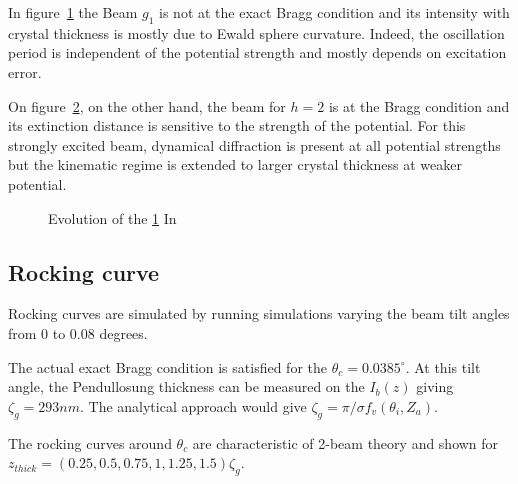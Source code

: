 \documentclass[a4paper,10pt]{article}
\begin{document}
In figure~\ref{fig:2_beam_I1} the Beam $g_1$ is not at the exact Bragg condition and its intensity with crystal thickness is mostly due to Ewald sphere curvature. Indeed, the oscillation period is independent of the potential strength and mostly depends on excitation error.

On figure~\ref{fig:2_beam_I2}, on the other hand, the beam for $h=2$ is at the Bragg condition and its extinction distance is sensitive to the strength of the potential.
For this strongly excited beam, dynamical diffraction is present at all potential strengths but the kinematic regime is extended to larger crystal thickness at weaker potential.

\begin{figure}[h!]
	\begin{subfigure}{\textwidth}
		\centering
		\begin{subfigure}{0.3\textwidth}
			\centering
      \def\svgwidth{\columnwidth}
			
			\caption{}\label{fig:2_beam_I1}
		\end{subfigure}
		\begin{subfigure}{0.3\textwidth}
			\centering
      \def\svgwidth{\columnwidth}
			
			\caption{}\label{fig:2_beam_I2}
		\end{subfigure}
		\begin{subfigure}{0.3\textwidth}
			\centering
      \def\svgwidth{\columnwidth}
			
			\caption{}\label{fig:2_beam_xi}
		\end{subfigure}
  \end{subfigure}
	\caption[2-beam extinction]{
    Evolution of the
		\ref{fig:2_beam_I1} In
	}\label{fig:2_beam_zeta}
\end{figure}


\subsection{Rocking curve}
Rocking curves are simulated by running simulations varying the beam tilt angles from 0 to 0.08 degrees.

The actual exact Bragg condition is satisfied for the $\theta_c=0.0385^{\circ}$.
At this tilt angle, the Pendullosung thickness can be measured on the $I_b(z)$ giving $\zeta_g=293nm$.
The analytical approach would give $\zeta_g=\pi/\sigma f_v(\theta_i,Z_a)$.

The rocking curves around $\theta_c$ are characteristic of 2-beam theory and shown for $z_{thick}=\left(0.25,0.5,0.75,1,1.25,1.5\right)\zeta_g$.
\end{document}
